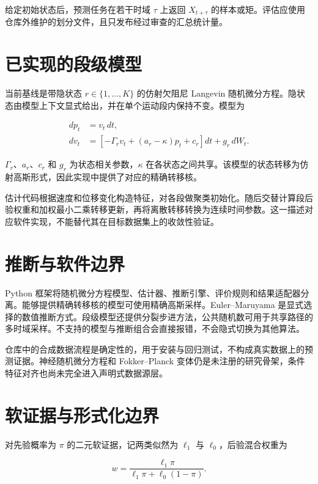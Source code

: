 \documentclass[UTF8,11pt]{ctexart}
\begin{document}
给定初始状态后，预测任务在若干时域 \(\tau\) 上返回 \(X_{t+\tau}\) 的样本或矩。评估应使用仓库外维护的划分文件，且只发布经过审查的汇总统计量。

\section{已实现的段级模型}

当前基线是带隐状态 \(r\in\{1,\ldots,K\}\) 的仿射欠阻尼 Langevin 随机微分方程。隐状态由模型上下文显式给出，并在单个运动段内保持不变。模型为

\begin{align}
  dp_t &= v_t\,dt, \\
  dv_t &= \left[-\Gamma_r v_t+(a_r-\kappa)p_t+c_r\right]dt+g_r\,dW_t.
  \label{eq:segment-sde-zh}
\end{align}

\(\Gamma_r\)、\(a_r\)、\(c_r\) 和 \(g_r\) 为状态相关参数，\(\kappa\) 在各状态之间共享。该模型的状态转移为仿射高斯形式，因此实现中提供了对应的精确转移核。

估计代码根据速度和位移变化构造特征，对各段做聚类初始化。随后交替计算段后验权重和加权最小二乘转移更新，再将离散转移转换为连续时间参数。这一描述对应软件实现，不能替代其在目标数据集上的收敛性验证。

\section{推断与软件边界}

Python 框架将随机微分方程模型、估计器、推断引擎、评价规则和结果适配器分离。能够提供精确转移核的模型可使用精确高斯采样。Euler--Maruyama 是显式选择的数值推断方式。段级模型还提供分裂步进方法，公共随机数可用于共享路径的多时域采样。不支持的模型与推断组合会直接报错，不会隐式切换为其他算法。

仓库中的合成数据流程是确定性的，用于安装与回归测试，不构成真实数据上的预测证据。神经随机微分方程和 Fokker--Planck 变体仍是未注册的研究骨架，条件特征对齐也尚未完全进入声明式数据源层。

\section{软证据与形式化边界}

对先验概率为 \(\pi\) 的二元软证据，记两类似然为 \(\ell_1\) 与 \(\ell_0\)，后验混合权重为

\begin{equation}
  w=\frac{\ell_1\pi}{\ell_1\pi+\ell_0(1-\pi)}.
  \label{eq:posterior-weight-zh}
\end{equation}
\end{document}
